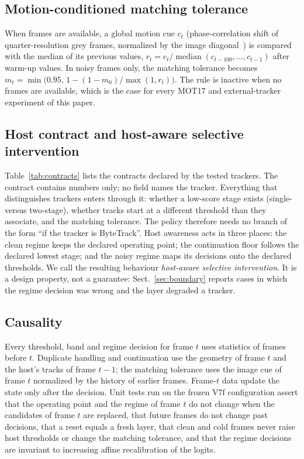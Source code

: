 \documentclass[pdflatex,sn-mathphys-num]{sn-jnl}
\begin{document}
\subsection{Motion-conditioned matching tolerance}\label{sec:motion}
When frames are available, a global motion cue $c_t$ (phase-correlation shift of quarter-resolution grey frames, normalized by the image diagonal~\cite{reddy1996phasecorr}) is compared with the median of its previous values, $r_t=c_t/\operatorname{median}(c_{t-100},\dots,c_{t-1})$ after  warm-up values. In noisy frames only, the matching tolerance becomes $m_t=\min\bigl(0.95,\,1-(1-m_0)/\max(1,r_t)\bigr)$. The rule is inactive when no frames are available, which is the case for every MOT17 and external-tracker experiment of this paper.

\subsection{Host contract and host-aware selective intervention}\label{sec:host}
Table~\ref{tab:contracts} lists the contracts declared by the tested trackers. The contract contains numbers only; no field names the tracker. Everything that distinguishes trackers enters through it: whether a low-score stage exists (single- versus two-stage), whether tracks start at a different threshold than they associate, and the matching tolerance. The policy therefore needs no branch of the form ``if the tracker is ByteTrack''. Host awareness acts in three places: the clean regime keeps the declared operating point; the continuation floor follows the declared lowest stage; and the noisy regime maps its decisions onto the declared thresholds. We call the resulting behaviour \emph{host-aware selective intervention}. It is a design property, not a guarantee: Sect.~\ref{sec:boundary} reports cases in which the regime decision was wrong and the layer degraded a tracker.



\subsection{Causality}\label{sec:causality}
Every threshold, band and regime decision for frame $t$ uses statistics of frames before $t$. Duplicate handling and continuation use the geometry of frame $t$ and the host's tracks of frame $t-1$; the matching tolerance uses the image cue of frame $t$ normalized by the history of earlier frames. Frame-$t$ data update the state only after the decision. Unit tests run on the frozen V7f configuration assert that the operating point and the regime of frame $t$ do not change when the candidates of frame $t$ are replaced, that future frames do not change past decisions, that a reset equals a fresh layer, that clean and cold frames never raise host thresholds or change the matching tolerance, and that the regime decisions are invariant to increasing affine recalibration of the logits.
\end{document}

